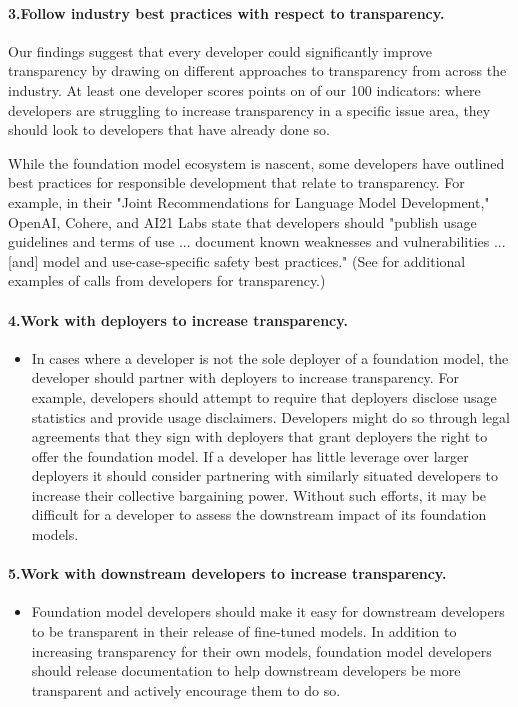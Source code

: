 \paragraph{3.\phantom{X}Follow industry best practices with respect to transparency.}
    \begin{myitemize}
        \item Our findings suggest that every developer could significantly improve transparency by drawing on different approaches to transparency from across the industry. 
        At least one developer scores points on \numfeasible of our 100 indicators: where developers are struggling to increase transparency in a specific issue area, they should look to developers that have already done so.
        \item While the foundation model ecosystem is nascent, some developers have outlined best practices for responsible development that relate to transparency. For example, in their "Joint Recommendations for Language Model Development," OpenAI, Cohere, and AI21 Labs state that developers should "publish usage guidelines and terms of use ... document known weaknesses and vulnerabilities ... [and] model and use-case-specific safety best practices." (See  for additional examples of calls from developers for transparency.)
    \end{myitemize}
\paragraph{4.\phantom{X}Work with deployers to increase transparency.} 
    \begin{itemize}
        \item In cases where a developer is not the sole deployer of a foundation model, the developer should partner with deployers to increase transparency. 
        For example, developers should attempt to require that deployers disclose usage statistics and provide usage disclaimers. Developers might do so through legal agreements that they sign with deployers that grant deployers the right to offer the foundation model. 
        If a developer has little leverage over larger deployers it should consider partnering with similarly situated developers to increase their collective bargaining power.
        Without such efforts, it may be difficult for a developer to assess the downstream impact of its foundation models. 
    \end{itemize}
\paragraph{5.\phantom{X}Work with downstream developers to increase transparency.} 
    \begin{itemize}
        \item Foundation model developers should make it easy for downstream developers to be transparent in their release of fine-tuned models. In addition to increasing transparency for their own models, foundation model developers should release documentation to help downstream developers be more transparent and actively encourage them to do so.
    \end{itemize}
